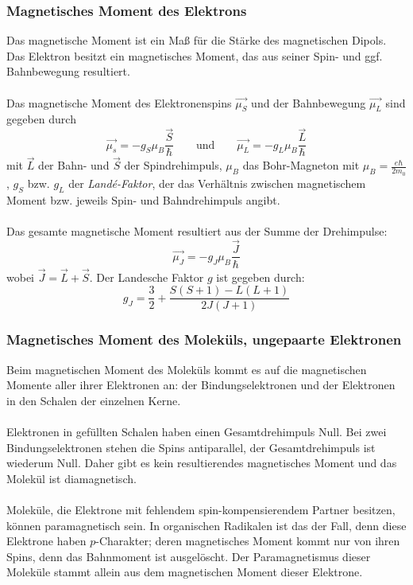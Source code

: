 \documentclass[a4paper,titlepage]{scrartcl}
\numberwithin{equation}{section}
\begin{document}
\subsubsection{Magnetisches Moment des Elektrons}
Das magnetische Moment ist ein Maß für die Stärke des magnetischen Dipols. Das Elektron besitzt ein magnetisches Moment, das aus seiner Spin- und ggf. Bahnbewegung resultiert.\\ \\
Das magnetische Moment des Elektronenspins $\vec{\mu_S}$ und der Bahnbewegung $\vec{\mu_L}$ sind gegeben durch
\begin{equation*}
\vec{\mu_s}=-g_S \mu_B \frac{\vec{S}}{\hbar} \quad \quad \text{und} \quad \quad \vec{\mu_L}=-g_L \mu_B \frac{\vec{L}}{\hbar}
\end{equation*}
mit $\vec{L}$ der Bahn- und $\vec{S}$ der Spindrehimpuls, $\mu_B$ das Bohr-Magneton mit $\mu_B=\frac{e \hbar}{2 m_0}$, $g_S$ bzw. $g_L$ der \emph{Landé-Faktor}, der das Verhältnis zwischen magnetischem Moment bzw. jeweils Spin- und Bahndrehimpuls angibt.\\ \\
Das gesamte magnetische Moment resultiert aus der Summe der Drehimpulse:
\begin{equation*}
\vec{\mu_J}=-g_J \mu_B \frac{\vec{J}}{\hbar}
\end{equation*}
wobei $\vec{J}=\vec{L}+\vec{S}$. Der Landesche Faktor $g$ ist gegeben durch:
\begin{equation*}
g_J=\frac{3}{2}+\frac{S (S+1) - L(L+1)}{2J(J+1)}
\end{equation*}
\subsubsection{Magnetisches Moment des Moleküls, ungepaarte Elektronen \cite{mappe}}
Beim magnetischen Moment des Moleküls kommt es auf die magnetischen Momente aller ihrer Elektronen an: der Bindungselektronen und der Elektronen in den Schalen der einzelnen Kerne.\\ \\
Elektronen in gefüllten Schalen haben einen Gesamtdrehimpuls Null. Bei zwei Bindungselektronen stehen die Spins antiparallel, der Gesamtdrehimpuls ist wiederum Null. Daher gibt es kein resultierendes magnetisches Moment und das Molekül ist diamagnetisch.\\ \\
Moleküle, die Elektrone mit fehlendem spin-kompensierendem Partner besitzen, können paramagnetisch sein. In organischen Radikalen ist das der Fall, denn diese Elektrone haben $p$-Charakter; deren magnetisches Moment kommt nur von ihren Spins, denn das Bahnmoment ist ausgelöscht. Der Paramagnetismus dieser Moleküle stammt allein aus dem magnetischen Moment dieser Elektrone.
\end{document}
